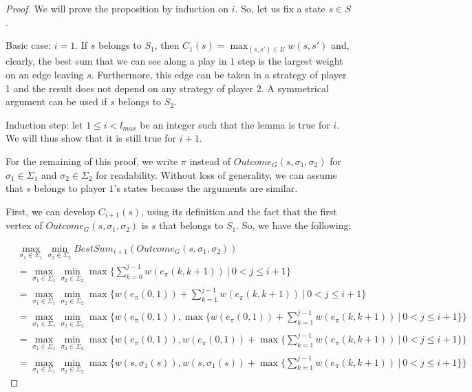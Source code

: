 \documentclass{article}
\theoremstyle{plain}
\begin{document}
\begin{proof}
We will prove the proposition by induction on $i$. So, let us fix a state $s \in S$.

Basic case: $i = 1$. If $s$ belongs to $S_1$, then $C_1(s) = \max_{(s, s') \in E} w(s, s')$ and, clearly, the best sum that we can see along a play in $1$ step is the largest weight on an edge leaving $s$. Furthermore, this edge can be taken in a strategy of player 1 and the result does not depend on any strategy of player $2$. A symmetrical argument can be used if $s$ belongs to $S_2$.

Induction step: let $1 \leqslant i < l_{max}$ be an integer such that the lemma is true for $i$. We will thus show that it is still true for $i+1$.

For the remaining of this proof, we write $\pi$ instead of $Outcome_G(s, \sigma_1, \sigma_2)$ for $\sigma_1 \in \Sigma_1$ and $\sigma_2 \in \Sigma_2$ for readability. Without loss of generality, we can assume that $s$ belongs to player $1$'s states because the arguments are similar.

First, we can develop $C_{i+1}(s)$, using its definition and the fact that the first vertex of $Outcome_G(s, \sigma_1, \sigma_2)$ is $s$ that belongs to $S_1$. So, we have the following:

\begin{align}
&\max_{\sigma_1 \in \Sigma_1} \min_{\sigma_2 \in \Sigma_2} BestSum_{i+1}(Outcome_G(s, \sigma_1, \sigma_2))
\\
&= \max_{\sigma_1 \in \Sigma_1} \min_{\sigma_2 \in \Sigma_2} \max \bigg\{ \sum_{k=0}^{j-1} w(e_{\pi}(k, k+1)) ~|~ 0 < j \leqslant i+1 \bigg\}
\\
&= \max_{\sigma_1 \in \Sigma_1} \min_{\sigma_2 \in \Sigma_2} \max \bigg\{ w(e_{\pi}(0, 1)) + \sum_{k=1}^{j-1} w(e_{\pi}(k, k+1)) ~|~ 0 < j \leqslant i+1 \bigg\}
\\
&= \max_{\sigma_1 \in \Sigma_1} \min_{\sigma_2 \in \Sigma_2} \max \bigg\{ w(e_{\pi}(0, 1)), \max \{w(e_{\pi}(0, 1)) + \sum_{k=1}^{j-1} w(e_{\pi}(k, k+1)) ~|~ 0 < j \leqslant i+1 \}\bigg\}
\\
&= \max_{\sigma_1 \in \Sigma_1} \min_{\sigma_2 \in \Sigma_2} \max \bigg\{ w(e_{\pi}(0, 1)), w(e_{\pi}(0, 1)) + \max \Big\{\sum_{k=1}^{j-1} w(e_{\pi}(k, k+1)) ~|~ 0 < j \leqslant i+1 \Big\}\bigg\}
\\
&= \max_{\sigma_1 \in \Sigma_1} \min_{\sigma_2 \in \Sigma_2} \max \bigg\{ w(s, \sigma_1(s)), w(s, \sigma_1(s)) + \max \Big\{\sum_{k=1}^{j-1} w(e_{\pi}(k, k+1)) ~|~ 0 < j \leqslant i+1 \Big\}\bigg\}
\end{align}


\end{proof}
\end{document}
